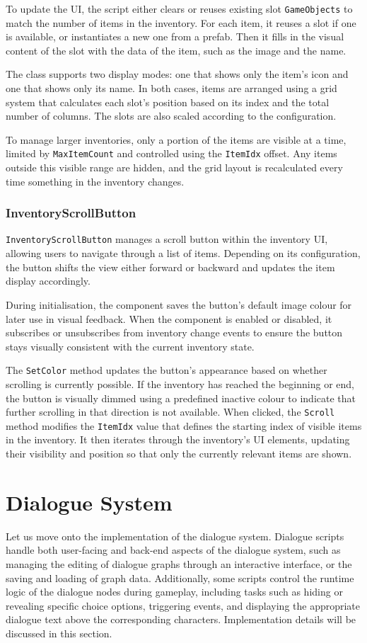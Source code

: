 To update the UI, the script either clears or reuses existing slot \verb|GameObjects| to match the number of items in the inventory. For each item, it reuses a slot if one is available, or instantiates a new one from a prefab. Then it fills in the visual content of the slot with the data of the item, such as the image and the name.

The class supports two display modes: one that shows only the item's icon and one that shows only its name. In both cases, items are arranged using a grid system that calculates each slot’s position based on its index and the total number of columns. The slots are also scaled according to the configuration.

To manage larger inventories, only a portion of the items are visible at a time, limited by \verb|MaxItemCount| and controlled using the \verb|ItemIdx| offset. Any items outside this visible range are hidden, and the grid layout is recalculated every time something in the inventory changes.
 
\subsubsection{InventoryScrollButton}
\verb|InventoryScrollButton| manages a scroll button within the inventory UI, allowing users to navigate through a list of items. Depending on its configuration, the button shifts the view either forward or backward and updates the item display accordingly.

During initialisation, the component saves the button's default image colour for later use in visual feedback. When the component is enabled or disabled, it subscribes or unsubscribes from inventory change events to ensure the button stays visually consistent with the current inventory state.

The \verb|SetColor| method updates the button’s appearance based on whether scrolling is currently possible. If the inventory has reached the beginning or end, the button is visually dimmed using a predefined inactive colour to indicate that further scrolling in that direction is not available. When clicked, the \verb|Scroll| method modifies the \verb|ItemIdx| value that defines the starting index of visible items in the inventory. It then iterates through the inventory’s UI elements, updating their visibility and position so that only the currently relevant items are shown.


\section{Dialogue System}
Let us move onto the implementation of the dialogue system. Dialogue scripts handle both user-facing and back-end aspects of the dialogue system, such as managing the editing of dialogue graphs through an interactive interface, or the saving and loading of graph data. Additionally, some scripts control the runtime logic of the dialogue nodes during gameplay, including tasks such as hiding or revealing specific choice options, triggering events, and displaying the appropriate dialogue text above the corresponding characters. Implementation details will be discussed in this section.

